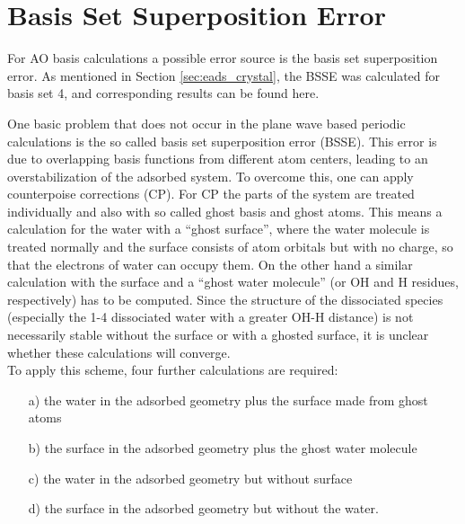 \documentclass[11pt,DIV=13,BCOR=5mm,a4paper,headinclude]{scrbook}
\begin{document}
\def\thefigure{B.\arabic{figure}}
\def\thetable{B.\arabic{table}}
\section{Basis Set Superposition Error}\label{app:BSSE}
For AO basis calculations a possible error source is the basis set superposition error.
As mentioned in Section \ref{sec:eads_crystal}, the BSSE was calculated for basis set 4, and corresponding results can be found here.

One basic problem that does not occur in the plane wave based periodic calculations is the so called basis set superposition error (BSSE).
This error is due to overlapping basis functions from different atom centers, leading to an overstabilization of the adsorbed system.
To overcome this, one can apply counterpoise corrections (CP)\cite{BSSE1970}. %
For CP the parts of the system are treated individually and also with so called ghost basis and ghost atoms.
This means a calculation for the water with a ``ghost surface'', where the water molecule is treated normally and the surface consists of atom orbitals but with no charge, so that the electrons of water can occupy them.
On the other hand a similar calculation with the surface and a ``ghost water molecule'' (or OH and H residues, respectively) has to be computed.
Since the structure of the dissociated species (especially the 1-4 dissociated water with a greater OH-H distance) is not necessarily stable without the surface or with a ghosted surface, it is unclear whether these calculations will converge.
\\

To apply this scheme, four further calculations are required:
\begin{itemize}
 \item[a)] the water in the adsorbed geometry plus the surface made from ghost atoms
 \item[b)] the surface in the adsorbed geometry plus the ghost water molecule
 \item[c)] the water in the adsorbed geometry but without surface
 \item[d)] the surface in the adsorbed geometry but without the water.
\end{itemize}
\end{document}
